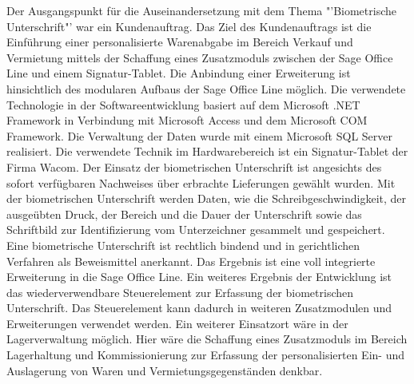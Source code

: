Der Ausgangspunkt für die Auseinandersetzung mit dem Thema "'Biometrische Unterschrift"' war ein Kundenauftrag. Das Ziel des Kundenauftrags ist die Einführung einer personalisierte Warenabgabe im Bereich Verkauf und Vermietung mittels der Schaffung eines Zusatzmoduls zwischen der Sage Office Line und einem Signatur-Tablet.
\newline
Die Anbindung einer Erweiterung ist hinsichtlich des modularen Aufbaus der Sage Office Line möglich. Die verwendete Technologie in der Softwareentwicklung basiert auf dem Microsoft .NET Framework in Verbindung mit Microsoft Access und dem Microsoft COM Framework. Die Verwaltung der Daten wurde mit einem Microsoft SQL Server realisiert. Die verwendete Technik im Hardwarebereich ist ein Signatur-Tablet der Firma Wacom. Der Einsatz der biometrischen Unterschrift ist angesichts des sofort verfügbaren Nachweises über erbrachte Lieferungen gewählt wurden. Mit der biometrischen Unterschrift werden Daten, wie die Schreibgeschwindigkeit, der ausgeübten Druck, der Bereich und die Dauer der Unterschrift sowie das Schriftbild zur Identifizierung vom Unterzeichner gesammelt und gespeichert. Eine biometrische Unterschrift ist rechtlich bindend und in gerichtlichen Verfahren als Beweismittel anerkannt. 
\newline
Das Ergebnis ist eine voll integrierte Erweiterung in die Sage Office Line. Ein weiteres Ergebnis der Entwicklung ist das wiederverwendbare Steuerelement zur Erfassung der biometrischen Unterschrift. Das Steuerelement kann dadurch in weiteren Zusatzmodulen und Erweiterungen verwendet werden. Ein weiterer Einsatzort wäre in der Lagerverwaltung möglich. Hier wäre die Schaffung eines Zusatzmoduls im Bereich Lagerhaltung und Kommissionierung zur Erfassung der personalisierten Ein- und Auslagerung von Waren und Vermietungsgegenständen denkbar.